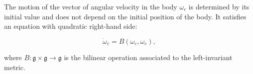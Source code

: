 The motion of the vector of angular velocity in the body $\omega_c$ is determined by its initial value and does not depend on the initial position of the body. It satisfies an equation with quadratic right-hand side:

$$\dot{\omega}_c = B(\omega_c, \omega_c),$$

where $B: \mathfrak{g} \times \mathfrak{g} \to \mathfrak{g}$ is the bilinear operation associated to the left-invariant metric.
